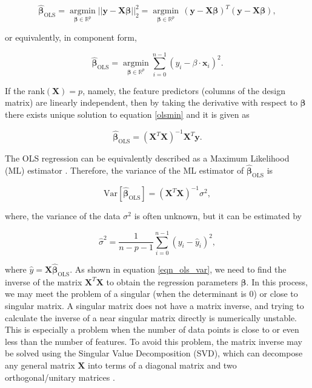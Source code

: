 \documentclass[a4paper]{article}
\begin{document}
\begin{equation}
    \hat{\boldsymbol{\beta}}_{\text{OLS}}=
    \underset{\boldsymbol{\beta}\in\mathbb{R}^p}{\operatorname{argmin}} ||\mathbf{y}-\textbf{X}\boldsymbol{\beta}||_2^2 = \underset{\boldsymbol{\beta}\in\mathbb{R}^p}{\operatorname{argmin}} \,(\mathbf{y}-\mathbf{X}\boldsymbol{\beta})^T(\mathbf{y}-\mathbf{X}\boldsymbol{\beta}),
    \label{olsmin}
\end{equation}


or equivalently, in component form,

\begin{equation}
    \hat{\boldsymbol{\beta}}_{\text{OLS}}=\underset{\boldsymbol{\beta}\in\mathbb{R}^p}{\operatorname{argmin}}   \sum_{i=0}^{n-1} (y_i -{\beta}\cdot\mathbf{x}_{i})^2.
\end{equation}


If the rank$(\mathbf{X})=p$, namely, the feature predictors (columns of the design matrix) are linearly independent, then by taking the derivative with respect to $\boldsymbol{\beta}$ there exists unique solution to equation \ref{olsmin} and it is given as


\begin{equation}
    \hat{\boldsymbol{\beta}}_{\text{OLS}}= (\mathbf{X}^T\mathbf{X})^{-1}\mathbf{X}^T \textbf{y}.
    \label{eqn_ols}
\end{equation}

The OLS regression can be equivalently described as a Maximum Likelihood (ML) estimator \cite{regression}. Therefore, the variance of the ML estimator of $\hat{\boldsymbol{\beta}}_{\text{OLS}}$ is

\begin{equation}
    \text{Var}[\hat{\boldsymbol{\beta}}_{\text{OLS}}] = (\mathbf{X}^T\mathbf{X})^{-1}{\sigma}^2,
    \label{eqn_ols_var}
\end{equation}

where, the variance of the data $\sigma^2$ is often unknown, but it can be estimated by \cite{hastie}


\begin{equation}
    \hat{\sigma}^2  = \frac{1}{n-p-1}\sum_{i=0}^{n-1}(y_i-\hat{y}_i)^2,
\end{equation}

where $\hat{y} = \mathbf{X}\hat{\boldsymbol{\beta}}_{\text{OLS}}$. As shown in equation \ref{eqn_ols_var}, we need to find the inverse of the matrix $\mathbf{X}^T\mathbf{X}$ to obtain the regression parameters $\boldsymbol{\beta}$. In this process, we may meet the problem of a singular (when the determinant is $0$) or close to singular matrix. A singular matrix does not have a matrix inverse, and trying to calculate the inverse of a near singular matrix directly is numerically unstable. This is especially a problem when the number of data points is close to or even less than the number of features. To avoid this problem, the matrix inverse may be solved using the Singular Value Decomposition (SVD), which can decompose any general matrix $\mathbf{X}$ into terms of a diagonal matrix and two orthogonal/unitary matrices \cite{lec}.
\end{document}
